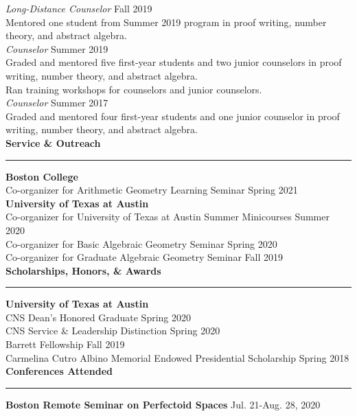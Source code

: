 \documentclass[11pt]{article}
\newenvironment{mysection}{
\color{mygreen}\bfseries\large
}
{
\\ \rule{\textwidth}{1pt}\hspace{-.25em}
} %
\begin{document}
\textit{Long-Distance Counselor} \hfill Fall 2019 \\
Mentored one student from Summer 2019 program in proof writing, number theory, and abstract algebra. \\

\textit{Counselor} \hfill Summer 2019 \\
Graded and mentored five first-year students and two junior counselors in proof writing, number theory, and abstract algebra. \\
Ran training workshops for counselors and junior counselors. \\

\textit{Counselor} \hfill Summer 2017 \\
Graded and mentored four first-year students and one junior counselor in proof writing, number theory, and abstract algebra. \\

\begin{mysection}Service \& Outreach\end{mysection}
\textbf{Boston College} \\
Co-organizer for Arithmetic Geometry Learning Seminar \hfill Spring 2021 \\

\textbf{University of Texas at Austin} \\
Co-organizer for University of Texas at Austin Summer Minicourses \hfill Summer 2020 \\
Co-organizer for Basic Algebraic Geometry Seminar \hfill Spring 2020 \\
Co-organizer for Graduate Algebraic Geometry Seminar \hfill Fall 2019 \\

\begin{mysection}Scholarships, Honors, \& Awards\end{mysection}
\textbf{University of Texas at Austin} \\
CNS Dean's Honored Graduate \hfill Spring 2020 \\
CNS Service \& Leadership Distinction \hfill Spring 2020 \\
Barrett Fellowship \hfill Fall 2019 \\
Carmelina Cutro Albino Memorial Endowed Presidential Scholarship \hfill Spring 2018 \\

\begin{mysection}Conferences Attended\end{mysection}
\textbf{Boston Remote Seminar on Perfectoid Spaces} \hfill Jul. 21-Aug. 28, 2020 \\
\end{document}
